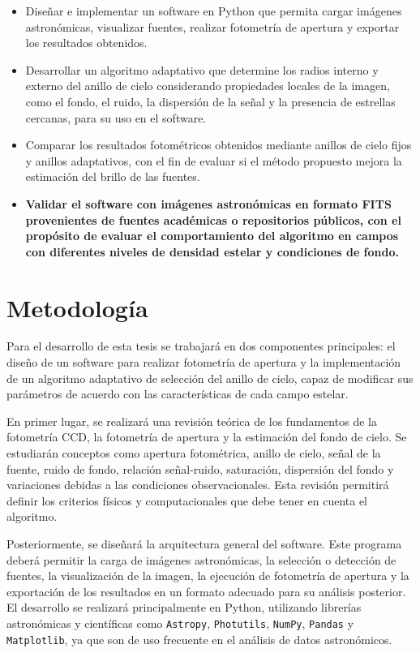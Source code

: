 \documentclass[9pt]{extarticle}
\begin{document}
\begin{itemize}
    \item Diseñar e implementar un software en Python que permita cargar imágenes astronómicas, visualizar fuentes, realizar fotometría de apertura y exportar los resultados obtenidos.

    \item Desarrollar un algoritmo adaptativo que determine los radios interno y externo del anillo de cielo considerando propiedades locales de la imagen, como el fondo, el ruido, la dispersión de la señal y la presencia de estrellas cercanas, para su uso en el software.

    \item Comparar los resultados fotométricos obtenidos mediante anillos de cielo fijos y anillos adaptativos, con el fin de evaluar si el método propuesto mejora la estimación del brillo de las fuentes.

    \item \textbf{Validar el software con imágenes astronómicas en formato FITS provenientes de fuentes académicas o repositorios públicos, con el propósito de evaluar el comportamiento del algoritmo en campos con diferentes niveles de densidad estelar y condiciones de fondo.}
\end{itemize}

\section{Metodología}

Para el desarrollo de esta tesis se trabajará en dos componentes principales: el diseño de un software para realizar fotometría de apertura y la implementación de un algoritmo adaptativo de selección del anillo de cielo, capaz de modificar sus parámetros de acuerdo con las características de cada campo estelar.

En primer lugar, se realizará una revisión teórica de los fundamentos de la fotometría CCD, la fotometría de apertura y la estimación del fondo de cielo. Se estudiarán conceptos como apertura fotométrica, anillo de cielo, señal de la fuente, ruido de fondo, relación señal-ruido, saturación, dispersión del fondo y variaciones debidas a las condiciones observacionales. Esta revisión permitirá definir los criterios físicos y computacionales que debe tener en cuenta el algoritmo.

Posteriormente, se diseñará la arquitectura general del software. Este programa deberá permitir la carga de imágenes astronómicas, la selección o detección de fuentes, la visualización de la imagen, la ejecución de fotometría de apertura y la exportación de los resultados en un formato adecuado para su análisis posterior. El desarrollo se realizará principalmente en Python, utilizando librerías astronómicas y científicas como \texttt{Astropy}, \texttt{Photutils}, \texttt{NumPy}, \texttt{Pandas} y \texttt{Matplotlib}, ya que son de uso frecuente en el análisis de datos astronómicos.
\end{document}
